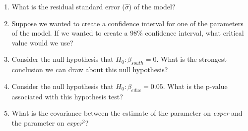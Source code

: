 \begin{enumerate}
\item What is the residual standard error ($\hat\sigma$) of the model?

\item Suppose we wanted to create a confidence interval for one of the parameters of the model. If we wanted to create a 98\% confidence interval, what critical value would we use?

\item Consider the null hypothesis that $H_0:\beta_{south}=0$. What is the strongest conclusion we can draw about this null hypothesis?

\item Consider the null hypothesis that $H_0:\beta_{educ}=0.05$. What is the p-value associated with this hypothesis test?

\item What is the covariance between the estimate of the parameter on \textit{exper} and the parameter on \textit{exper}$^2$?


\end{enumerate}
